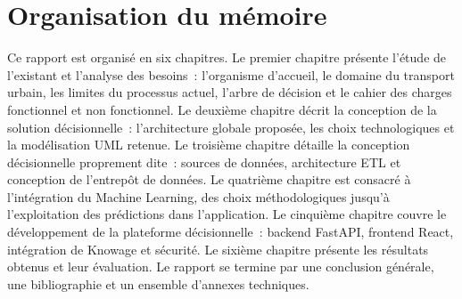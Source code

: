 \section*{Organisation du mémoire}
Ce rapport est organisé en six chapitres. Le premier chapitre présente l'étude de l'existant et l'analyse des besoins~: l'organisme d'accueil, le domaine du transport urbain, les limites du processus actuel, l'arbre de décision et le cahier des charges fonctionnel et non fonctionnel. Le deuxième chapitre décrit la conception de la solution décisionnelle~: l'architecture globale proposée, les choix technologiques et la modélisation UML retenue. Le troisième chapitre détaille la conception décisionnelle proprement dite~: sources de données, architecture ETL et conception de l'entrepôt de données. Le quatrième chapitre est consacré à l'intégration du Machine Learning, des choix méthodologiques jusqu'à l'exploitation des prédictions dans l'application. Le cinquième chapitre couvre le développement de la plateforme décisionnelle~: backend FastAPI, frontend React, intégration de Knowage et sécurité. Le sixième chapitre présente les résultats obtenus et leur évaluation. Le rapport se termine par une conclusion générale, une bibliographie et un ensemble d'annexes techniques.

\clearpage
